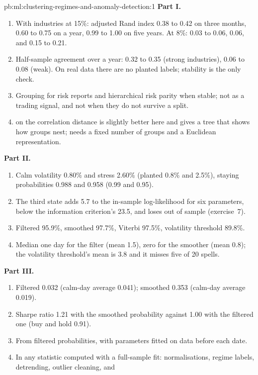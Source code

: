 \begin{solution}{pb:ml:clustering-regimes-and-anomaly-detection:1}
\textbf{Part I.}
\begin{enumerate}
\item With industries at 15\%: adjusted Rand index 0.38 to 0.42 on three months, 0.60 to 0.75 on a year, 0.99 to 1.00 on five
years. At 8\%: 0.03 to 0.06, 0.06, and 0.15 to 0.21.
\item Half-sample agreement over a year: 0.32 to 0.35 (strong industries), 0.06 to 0.08 (weak). On real data there are no
planted labels; stability is the only check.
\item Grouping for risk reports and hierarchical risk parity when stable; not as a trading signal, and not when they do not
survive a split.
\item {} on the correlation distance is slightly better here and gives a tree that shows how groups
nest;  needs a fixed number of groups and a Euclidean representation.
\end{enumerate}
\textbf{Part II.}
\begin{enumerate}[resume]
\item Calm volatility 0.80\% and stress 2.60\% (planted 0.8\% and 2.5\%), staying probabilities 0.988 and 0.958 (0.99 and
0.95).
\item The third state adds 5.7 to the in-sample log-likelihood for six parameters, below the information criterion's 23.5, and
loses out of sample (exercise~7).
\item Filtered 95.9\%, smoothed 97.7\%, Viterbi 97.5\%, volatility threshold 89.8\%.
\item Median one day for the filter (mean 1.5), zero for the smoother (mean 0.8); the volatility threshold's mean is 3.8 and it
misses five of 20 spells.
\end{enumerate}
\textbf{Part III.}
\begin{enumerate}[resume]
\item Filtered 0.032 (calm-day average 0.041); smoothed 0.353 (calm-day average 0.019).
\item Sharpe ratio 1.21 with the smoothed probability against 1.00 with the filtered one (buy and hold 0.91).
\item From filtered probabilities, with parameters fitted on data before each date.
\item In any statistic computed with a full-sample fit: normalisations, regime labels, detrending, outlier cleaning, and

\end{enumerate}
\end{solution}
